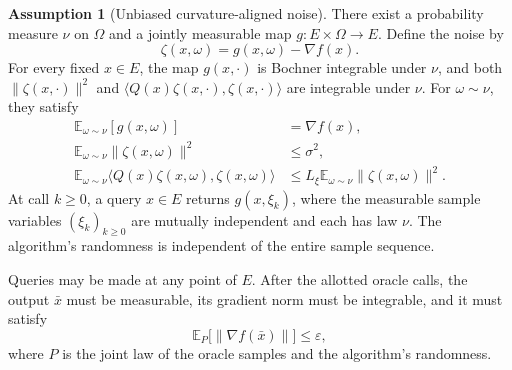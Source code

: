 \documentclass[10pt]{article}
\theoremstyle{definition}
\newtheorem{assumption}{Assumption}
\begin{document}
\begin{assumption}[Unbiased curvature-aligned noise]
There exist a probability measure $\nu$ on $\Omega$ and a jointly measurable map $g:E\times\Omega\to E$. Define the noise by
\[
\zeta(x,\omega)=g(x,\omega)-\nabla f(x).
\]
For every fixed $x\in E$, the map $g(x,\cdot)$ is Bochner integrable under $\nu$, and both $\|\zeta(x,\cdot)\|^2$ and $\langle Q(x)\zeta(x,\cdot),\zeta(x,\cdot)\rangle$ are integrable under $\nu$. For $\omega\sim\nu$, they satisfy
\[
\begin{aligned}
\mathbb{E}_{\omega\sim\nu}[g(x,\omega)]&=\nabla f(x),\\
\mathbb{E}_{\omega\sim\nu}\|\zeta(x,\omega)\|^2&\leq\sigma^2,\\
\mathbb{E}_{\omega\sim\nu}
\langle Q(x)\zeta(x,\omega),\zeta(x,\omega)\rangle
&\leq L_\xi\mathbb{E}_{\omega\sim\nu}\|\zeta(x,\omega)\|^2.
\end{aligned}
\]
At call $k\geq0$, a query $x\in E$ returns $g(x,\xi_k)$, where the measurable sample variables $(\xi_k)_{k\geq0}$ are mutually independent and each has law $\nu$. The algorithm's randomness is independent of the entire sample sequence.
\end{assumption}

Queries may be made at any point of $E$. After the allotted oracle calls, the output $\bar{x}$ must be measurable, its gradient norm must be integrable, and it must satisfy
\[
\mathbb{E}_{P}\bigl[\|\nabla f(\bar{x})\|\bigr]\leq\varepsilon,
\]
where $P$ is the joint law of the oracle samples and the algorithm's randomness.
\end{document}
